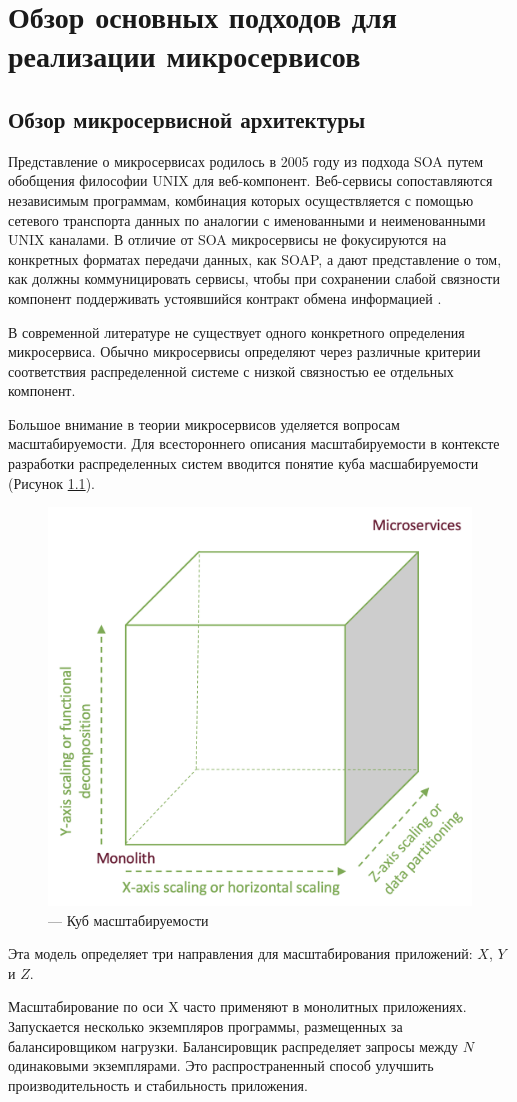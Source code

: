 \chapter{Обзор основных подходов для реализации микросервисов}
\section{Обзор микросервисной архитектуры}

Представление о микросервисах родилось в 2005 году из подхода SOA путем обобщения философии UNIX для веб-компонент.
Веб-сервисы сопоставляются независимым программам, комбинация которых осуществляется с помощью сетевого транспорта данных по аналогии с именованными и неименованными UNIX каналами.
В отличие от SOA микросервисы не фокусируются на конкретных форматах передачи данных, как SOAP, 
а дают представление о том, как должны коммуницировать сервисы, чтобы при сохранении слабой связности компонент поддерживать устоявшийся контракт обмена информацией \cite{micro-1}.

В современной литературе не существует одного конкретного определения микросервиса. 
Обычно микросервисы определяют через различные критерии соответствия распределенной системе с низкой связностью ее отдельных компонент.

Большое внимание в теории микросервисов уделяется вопросам масштабируемости. 
Для всестороннего описания масштабируемости в контексте разработки распределенных систем вводится понятие куба масшабируемости \cite{scalability} (Рисунок \ref{fig:cube}).

\begin{figure}[H]
    \centering
    \includegraphics[width=0.4\linewidth]{img/cube.png}
    \caption{--- Куб масштабируемости}
    \label{fig:cube}
\end{figure}

Эта модель определяет три направления для масштабирования приложений: $X$, $Y$ и $Z$.

Масштабирование по оси X часто применяют в монолитных приложениях. 
Запускается несколько экземпляров программы, размещенных за балансировщиком нагрузки. 
Балансировщик распределяет запросы между $N$ одинаковыми экземплярами. 
Это распространенный способ улучшить
производительность и стабильность приложения.

